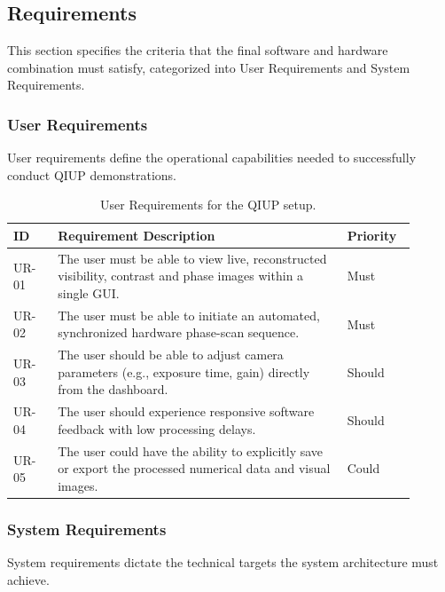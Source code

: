 \documentclass[12pt,a4paper]{article}
\begin{document}
    \subsection{Requirements}
    This section specifies the criteria that the final software and hardware combination must satisfy, categorized into User Requirements and System Requirements.

    \subsubsection{User Requirements}
    User requirements define the operational capabilities needed to successfully conduct \ac{QIUP} demonstrations.

    \begin{table}[H]
        \centering
        \renewcommand{\arraystretch}{1.3}
        \begin{tabular}{|p{0.1\linewidth}|p{0.65\linewidth}|p{0.15\linewidth}|}
            \hline
            \textbf{ID} & \textbf{Requirement Description} & \textbf{Priority} \\ \hline
            UR-01 & The user must be able to view live, reconstructed visibility, contrast and phase images within a single \ac{GUI}. & Must \\ \hline
            UR-02 & The user must be able to initiate an automated, synchronized hardware phase-scan sequence. & Must \\ \hline
            UR-03 & The user should be able to adjust camera parameters (e.g., exposure time, gain) directly from the dashboard. & Should \\ \hline
            UR-04 & The user should experience responsive software feedback with low processing delays. & Should \\ \hline
            UR-05 & The user could have the ability to explicitly save or export the processed numerical data and visual images. & Could \\ \hline
        \end{tabular}
        \caption{User Requirements for the QIUP setup.}
        \label{tab:user_requirements}
    \end{table}

    \subsubsection{System Requirements}
    System requirements dictate the technical targets the system architecture must achieve.
    
\end{document}
